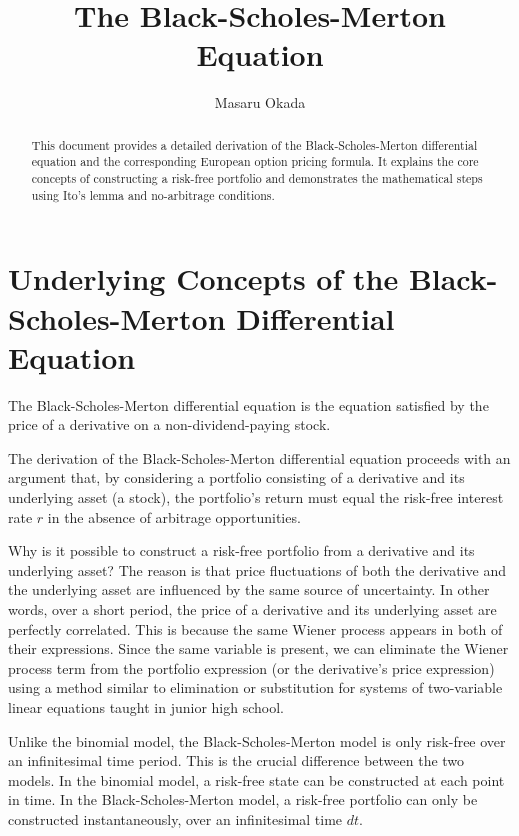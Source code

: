 \documentclass[uplatex]{jsarticle}
\title{The Black-Scholes-Merton Equation}
\author{
Masaru Okada
}
\begin{document}
\maketitle

\begin{abstract}
    This document provides a detailed derivation of the Black-Scholes-Merton differential equation and the corresponding European option pricing formula. It explains the core concepts of constructing a risk-free portfolio and demonstrates the mathematical steps using Ito's lemma and no-arbitrage conditions.
\end{abstract}

\section{Underlying Concepts of the Black-Scholes-Merton Differential Equation}

The Black-Scholes-Merton differential equation is the equation satisfied by the price of a derivative on a non-dividend-paying stock.

The derivation of the Black-Scholes-Merton differential equation proceeds with an argument that, by considering a portfolio consisting of a derivative and its underlying asset (a stock), the portfolio's return must equal the risk-free interest rate $r$ in the absence of arbitrage opportunities.

Why is it possible to construct a risk-free portfolio from a derivative and its underlying asset? The reason is that price fluctuations of both the derivative and the underlying asset are influenced by the same source of uncertainty. In other words, over a short period, the price of a derivative and its underlying asset are perfectly correlated. This is because the same Wiener process appears in both of their expressions. Since the same variable is present, we can eliminate the Wiener process term from the portfolio expression (or the derivative's price expression) using a method similar to elimination or substitution for systems of two-variable linear equations taught in junior high school.

Unlike the binomial model, the Black-Scholes-Merton model is only risk-free over an infinitesimal time period. This is the crucial difference between the two models. In the binomial model, a risk-free state can be constructed at each point in time. In the Black-Scholes-Merton model, a risk-free portfolio can only be constructed instantaneously, over an infinitesimal time $dt$.
\end{document}
